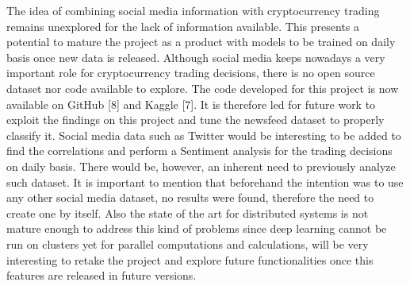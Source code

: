 The idea of combining social media information with cryptocurrency trading remains unexplored for the lack of information available. This presents a potential to mature the project as a product with models to be trained on daily basis once new data is released. Although social media keeps nowadays a very important role for cryptocurrency trading decisions, there is no open source dataset nor code available to explore. The code developed for this project is now available on GitHub [8] and Kaggle [7]. It is therefore led for future work to exploit the findings on this project and tune the newsfeed dataset to properly classify it. Social media data such as Twitter would be interesting to be added to find the correlations and perform a Sentiment analysis for the trading decisions on daily basis. There would be, however, an inherent need to previously analyze such dataset. It is important to mention that beforehand the intention was to use any other social media dataset, no results were found, therefore the need to create one by itself. Also the state of the art for distributed systems is not mature enough to address this kind of problems since deep learning cannot be run on clusters yet for parallel computations and calculations, will be very interesting to retake the project and explore future functionalities once this features are released in future versions.